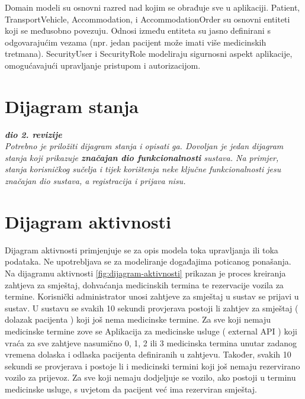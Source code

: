 			 Domain modeli su osnovni razred nad kojim se obrađuje sve u aplikaciji.  Patient, TransportVehicle, Accommodation, i AccommodationOrder su osnovni entiteti koji se međusobno povezuju. Odnosi između entiteta su jasno definirani s odgovarajućim vezama (npr. jedan pacijent može imati više medicinskih tretmana). SecurityUser i SecurityRole modeliraju sigurnosni aspekt aplikacije, omogućavajući upravljanje pristupom i autorizacijom. 
			
			
			\eject
		
		\section{Dijagram stanja}
			
			
			\textbf{\textit{dio 2. revizije}}\\
			
			\textit{Potrebno je priložiti dijagram stanja i opisati ga. Dovoljan je jedan dijagram stanja koji prikazuje \textbf{značajan dio funkcionalnosti} sustava. Na primjer, stanja korisničkog sučelja i tijek korištenja neke ključne funkcionalnosti jesu značajan dio sustava, a registracija i prijava nisu. }
			
			
			\eject 
		
		\section{Dijagram aktivnosti}
			
			Dijagram aktivnosti primjenjuje se za opis modela toka upravljanja ili toka podataka. Ne upotrebljava se za modeliranje događajima poticanog ponašanja. 
			Na dijagramu aktivnosti \ref{fig:dijagram-aktivnosti} prikazan je proces kreiranja zahtjeva za smještaj, dohvaćanja medicinskih termina te rezervacije vozila za termine. Korisnički administrator unosi zahtjeve za smještaj u sustav se prijavi u sustav. U sustavu se svakih 10 sekundi provjerava postoji li zahtjev za smještaj ( dolazak pacijenta ) koji još nema medicinske termine. Za sve koji nemaju medicinske termine zove se Aplikacija za medicinske usluge ( external API ) koji vraća za sve zahtjeve nasumično 0, 1, 2 ili 3 medicinska termina unutar zadanog vremena dolaska i odlaska pacijenta definiranih u zahtjevu. Također, svakih 10 sekundi se provjerava i postoje li i medicinski termini koji još nemaju rezervirano vozilo za prijevoz. Za sve koji nemaju dodjeljuje se vozilo, ako postoji u terminu medicinske usluge, s uvjetom da pacijent već ima rezerviran smještaj.
			
